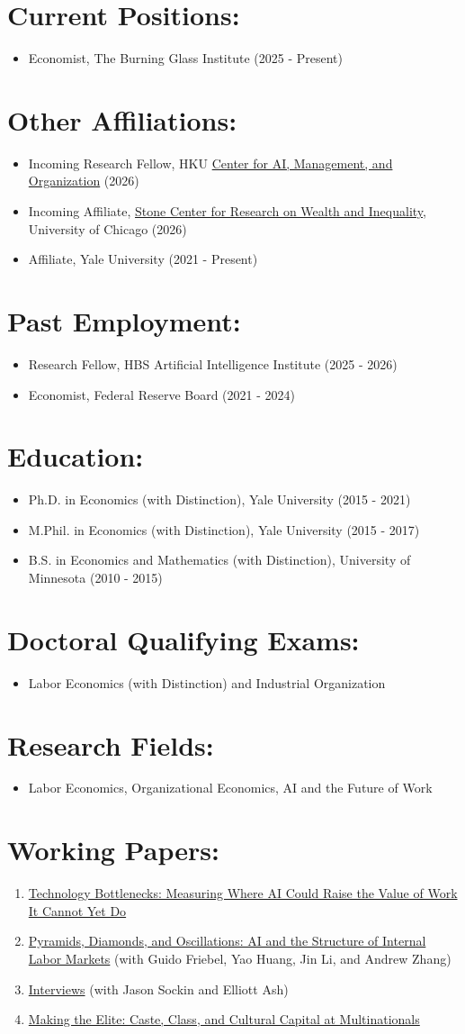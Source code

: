 \documentclass[11pt,letterpaper]{article}
\newcommand{\cvsection}[1]{\Needspace{5\baselineskip}\section*{#1:}}
\begin{document}
\cvsection{Current Positions}
\begin{itemize}
\item Economist, The Burning Glass Institute (2025 - Present)
\end{itemize}
\cvsection{Other Affiliations}
\begin{itemize}
\item Incoming Research Fellow, HKU \href{https://camo.hku.hk/}{Center for AI, Management, and Organization} (2026)
\item Incoming Affiliate, \href{https://stonecenter.uchicago.edu/}{Stone Center for Research on Wealth and Inequality}, University of Chicago (2026)
\item Affiliate, Yale University (2021 - Present)
\end{itemize}
\cvsection{Past Employment}
\begin{itemize}
\item Research Fellow, HBS Artificial Intelligence Institute (2025 - 2026)
\item Economist, Federal Reserve Board (2021 - 2024)
\end{itemize}
\cvsection{Education}
\begin{itemize}
\item Ph.D. in Economics (with Distinction), Yale University (2015 - 2021)
\item M.Phil. in Economics (with Distinction), Yale University (2015 - 2017)
\item B.S. in Economics and Mathematics (with Distinction), University of Minnesota (2010 - 2015)
\end{itemize}
\cvsection{Doctoral Qualifying Exams}
\begin{itemize}
\item Labor Economics (with Distinction) and Industrial Organization
\end{itemize}
\cvsection{Research Fields}
\begin{itemize}
\item Labor Economics, Organizational Economics, AI and the Future of Work
\end{itemize}
\cvsection{Working Papers}
\begin{enumerate}[label=\arabic*.,leftmargin=28.8pt,itemsep=2pt,parsep=0pt,topsep=0pt]
\item \href{https://soumitrashukla.github.io/Technology_Bottlenecks_Oct2026.pdf}{Technology Bottlenecks: Measuring Where AI Could Raise the Value of Work It Cannot Yet Do}
\item \href{https://papers.ssrn.com/sol3/papers.cfm?abstract_id=6570519}{Pyramids, Diamonds, and Oscillations: AI and the Structure of Internal Labor Markets} (with Guido Friebel, Yao Huang, Jin Li, and Andrew Zhang)
\item \href{https://papers.ssrn.com/sol3/papers.cfm?abstract_id=5681703}{Interviews} (with Jason Sockin and Elliott Ash)
\item \href{https://papers.ssrn.com/sol3/papers.cfm?abstract_id=4497449}{Making the Elite: Caste, Class, and Cultural Capital at Multinationals}
\end{enumerate}
\end{document}

